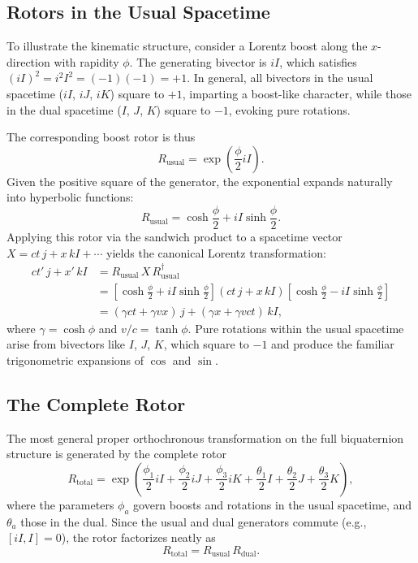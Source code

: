 \documentclass[dvipdfmx,a4paper]{article}
\begin{document}
\subsection{Rotors in the Usual Spacetime}

To illustrate the kinematic structure, consider a Lorentz boost along the $x$-direction with rapidity $\phi$. The generating bivector is $iI$, which satisfies $(iI)^2 = i^2 I^2 = (-1)(-1) = +1$. In general, all bivectors in the usual spacetime ($iI$, $iJ$, $iK$) square to $+1$, imparting a boost-like character, while those in the dual spacetime ($I$, $J$, $K$) square to $-1$, evoking pure rotations.

The corresponding boost rotor is thus
\[
R_\text{usual} = \exp\!\left( \frac{\phi}{2} iI \right).
\]
Given the positive square of the generator, the exponential expands naturally into hyperbolic functions:
\[
R_\text{usual} = \cosh \frac{\phi}{2} + iI \sinh \frac{\phi}{2}.
\]
Applying this rotor via the sandwich product to a spacetime vector $X = ct \, j + x \, kI + \cdots$ yields the canonical Lorentz transformation:
\begin{align*}
ct' \, j + x' \, kI &= R_\text{usual} \, X \, R_\text{usual}^\dagger \\
&= \left[ \cosh\frac{\phi}{2} + iI \sinh\frac{\phi}{2} \right] (ct \, j + x \, kI) \left[ \cosh\frac{\phi}{2} - iI \sinh\frac{\phi}{2} \right] \\
&= (\gamma ct + \gamma v x) \, j + (\gamma x + \gamma v ct) \, kI,
\end{align*}
where $\gamma = \cosh \phi$ and $v/c = \tanh \phi$. Pure rotations within the usual spacetime arise from bivectors like $I$, $J$, $K$, which square to $-1$ and produce the familiar trigonometric expansions of $\cos$ and $\sin$.

\subsection{The Complete Rotor}

The most general proper orthochronous transformation on the full biquaternion structure is generated by the complete rotor
\[
R_\text{total} = \exp\left( \frac{\phi_1}{2} iI + \frac{\phi_2}{2} iJ + \frac{\phi_3}{2} iK + \frac{\theta_1}{2} I + \frac{\theta_2}{2} J + \frac{\theta_3}{2} K \right),
\]
where the parameters $\phi_a$ govern boosts and rotations in the usual spacetime, and $\theta_a$ those in the dual. Since the usual and dual generators commute (e.g., $[iI, I] = 0$), the rotor factorizes neatly as
\[
R_\text{total} = R_\text{usual} \, R_\text{dual}.
\]
\end{document}
